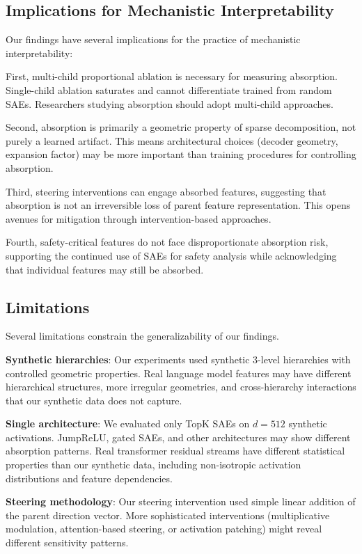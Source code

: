 \documentclass{article}
\begin{document}
\subsection{Implications for Mechanistic Interpretability}

Our findings have several implications for the practice of mechanistic interpretability:

First, multi-child proportional ablation is necessary for measuring absorption. Single-child ablation saturates and cannot differentiate trained from random SAEs. Researchers studying absorption should adopt multi-child approaches.

Second, absorption is primarily a geometric property of sparse decomposition, not purely a learned artifact. This means architectural choices (decoder geometry, expansion factor) may be more important than training procedures for controlling absorption.

Third, steering interventions can engage absorbed features, suggesting that absorption is not an irreversible loss of parent feature representation. This opens avenues for mitigation through intervention-based approaches.

Fourth, safety-critical features do not face disproportionate absorption risk, supporting the continued use of SAEs for safety analysis while acknowledging that individual features may still be absorbed.

\subsection{Limitations}

Several limitations constrain the generalizability of our findings.

\textbf{Synthetic hierarchies}: Our experiments used synthetic 3-level hierarchies with controlled geometric properties. Real language model features may have different hierarchical structures, more irregular geometries, and cross-hierarchy interactions that our synthetic data does not capture.

\textbf{Single architecture}: We evaluated only TopK SAEs on $d=512$ synthetic activations. JumpReLU, gated SAEs, and other architectures may show different absorption patterns. Real transformer residual streams have different statistical properties than our synthetic data, including non-isotropic activation distributions and feature dependencies.

\textbf{Steering methodology}: Our steering intervention used simple linear addition of the parent direction vector. More sophisticated interventions (multiplicative modulation, attention-based steering, or activation patching) might reveal different sensitivity patterns.
\end{document}
